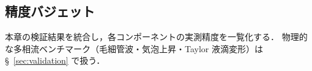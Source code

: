 %

\subsection{精度バジェット}
\label{sec:error_budget}

本章の検証結果を統合し，各コンポーネントの実測精度を一覧化する．
物理的な多相流ベンチマーク（毛細管波・気泡上昇・Taylor 液滴変形）は §~\ref{sec:validation} で扱う．

